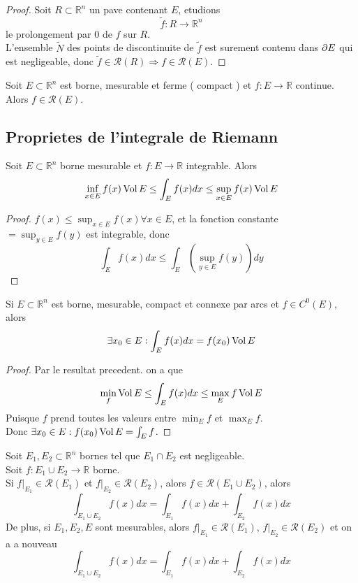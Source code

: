 \documentclass[../main.tex]{subfiles}
\begin{document}
\begin{proof}
Soit $R \subset \mathbb{R}^n$ un pave contenant $E$, etudions 
\[ 
\tilde f : R \to \mathbb{R}^n
\]
le prolongement par $0$ de $f$ sur $R$.\\
L'ensemble $\tilde N$ des points de discontinuite de $\tilde f$ est surement contenu dans $\partial E$ qui est negligeable, donc $\tilde f \in \mathcal{R}( R) \Rightarrow f \in \mathcal{R}( E) $.
\end{proof}
\begin{crly}
	Soit $E \subset \mathbb{R}^n$ est borne, mesurable et ferme ( compact ) et $f : E \to \mathbb{R}$ continue. Alors $f \in \mathcal{R}( E) $.
\end{crly}
\subsection{Proprietes de l'integrale de Riemann}
Soit $E \subset \mathbb{R}^n$ borne mesurable et $f : E \to \mathbb{R}$ integrable.
Alors
\[ 
	\inf_{x \in E} f( x) \operatorname*{Vol} E \leq \int_E f( x) dx \leq \sup_{x \in E}  f( x)\operatorname*{Vol} E 
\]
\begin{proof}
	$f( x) \leq \sup_{x\in E} f( x) \forall x \in E$, et la fonction constante $= \sup_{y\in E} f( y) $ est integrable, donc
	\[ 
		\int_E f( x) dx \leq  \int_E ( \sup_{y \in E  } f(y)) dy
	\]
\end{proof}
Si $ E \subset \mathbb{R}^n$ est borne, mesurable, compact et connexe par arcs et $f \in C^{0}( E) $, alors 
\[ 
	\exists x_0 \in E: \int_E f( x) dx = f( x_0) \operatorname*{Vol} E
\]

\begin{proof}
	Par le resultat precedent. on a que
	\[ 
		\min_ f \operatorname*{Vol} E \leq  \int_E f( x) dx \leq  \max_E f\operatorname*{Vol} E
	\]
	Puisque $f$ prend toutes les valeurs entre $\min_E f$ et $\max_E f $.\\
	Donc $\exists x_0\in E: f( x_0) \operatorname*{Vol} E = \int_E f$.
\end{proof}
Soit $E_1, E_2 \subset \mathbb{R}^n$ bornes tel que $E_1 \cap E_2$ est negligeable.\\
Soit $f: E_1 \cup E_2 \to \mathbb{R}$ borne.\\
Si $f\vert_{E_1} \in \mathcal{R}( E_1) $ et $f\vert_{E_2} \in \mathcal{R}( E_2) $, alors $f \in \mathcal{R}( E_1\cup E_2) $, alors
\[ 
	\int_{E_1\cup E_2} f( x) dx = \int_{ E_1 }^{  }f( x) dx + \int_{ E_2 }^{  }f( x) dx
\]
De plus, si $E_1, E_2, E$ sont mesurables, alors $f\vert_{E_1} \in \mathcal{R}( E_1) $, $f \vert _{E_2} \in \mathcal{R}( E_2) $ et on a a nouveau
\[ 
	\int_{E_1\cup E_2} f( x) dx = \int_{ E_1 }^{  }f( x) dx + \int_{ E_2 }^{  }f( x) dx
\]
\end{document}
